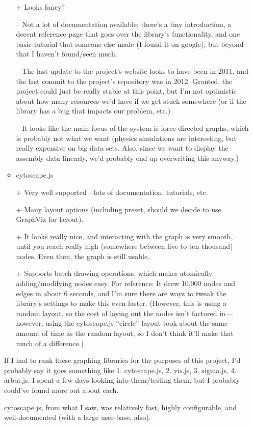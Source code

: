 \documentclass[12pt]{article}
\begin{document}
\begin{enumerate}
\begin{itemize}
			+ Looks fancy?

			-- Not a lot of documentation available; there's
			a tiny introduction, a decent reference page
			that goes over the library's functionality, and
			one basic tutorial that someone else made (I found it
			on google), but beyond that I haven't found/seen much.

			-- The last update to the project's website looks
			to have been in 2011, and the last commit to the
			project's repository was in 2012. Granted, the
			project could just be really stable at this point,
			but I'm not
			optimistic about how many resources we'd have if
			we get stuck somewhere (or if the library has a
			bug that impacts our problem, etc.)

			-- It looks like the main focus of the system is
			force-directed graphs, which is probably not what
			we want (physics simulations are interesting, but
			really expensive on big data sets. Also, since we
			want to display the assembly data linearly, we'd
			probably end up overwriting this anyway.)
		\item cytoscape.js

			+ Very well supported---lots of documentation,
			tutorials, etc.

			+ Many layout options (including preset, should
			we decide to use GraphViz for layout). 

			+ It looks really nice, and interacting with the
			graph is very smooth, until you reach really high
			(somewhere between five to ten thousand) nodes.
			Even then, the graph is still usable.

		 	+ Supports batch drawing operations, which makes
			atomically
			adding/modifying nodes easy.
			For reference: It drew 10,000 nodes and edges in
			about
			6 seconds, and I'm sure there are ways to tweak
			the library's settings to make this even faster.
			(However, this is using a random layout, so the
			cost of laying out the nodes isn't factored in---
			however, using the cytoscape.js ``circle'' layout
			took about the same amount of time as the
			random layout, so I don't think it'll make that
			much of a difference.)
	\end{itemize}
	If I had to rank these graphing libraries for the purposes of this
	project, I'd probably say it goes something like 1. cytoscape.js,
	2. vis.js, 3. sigma.js, 4. arbor.js. I spent a few days looking
	into them/testing them, but I probably could've found more out
	about each.
	
	cytoscape.js, from what I saw, was relatively fast, highly
	configurable, and well-documented (with a large user-base, also).


\end{enumerate}
\end{document}
